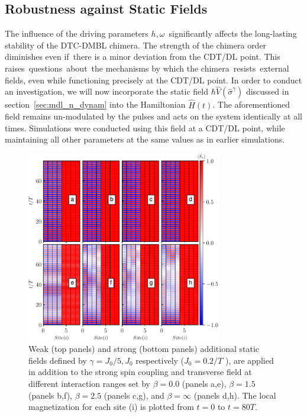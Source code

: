 \documentclass[
nofootinbib,
reprint,
superscriptaddress,
amsmath,amssymb,showkeys,
aps,
prb,
]{revtex4-2}
\begin{document}
	\subsection{\label{sec:level43} Robustness against Static Fields}
	The influence of the driving parameters $h, \omega$ significantly affects the long-lasting stability of the DTC-DMBL chimera. The strength of the chimera order diminishes even if there is a minor deviation from the CDT/DL point. This raises questions about the mechanisms by which the chimera resists external fields, even while functioning precisely at the CDT/DL point.
	In order to conduct an investigation, we will now incorporate the static field $\hbar\hat{V}(\hat{\sigma}^{\gamma})$ discussed in section~\ref{sec:mdl_n_dynam} into the Hamiltonian $\hat{H}(t)$. The aforementioned field remains un-modulated by the pulses and acts on the system identically at all times. Simulations were conducted using this field at a CDT/DL point, while maintaining all other parameters at the same values as in earlier simulations. 
	\begin{figure}
		\begin{center}
			\includegraphics[width=8.5cm]{robustness_N_8.pdf}
		\end{center}
		\caption{Weak (top panels) and strong (bottom panels) additional static fields defined by $\gamma = J_0/5, J_0$ respectively ($J_0=0.2/T$ ), are applied in addition to the strong spin coupling and transverse field at different interaction ranges set by $\beta = 0.0$ (panels a,e), $\beta= 1.5$ (panels b,f), $\beta=2.5$ (panels c,g), and $\beta= \infty$ (panels d,h). The local magnetization for each site (i) is plotted from $t=0$ to $t=80 T$.}
		\label{Fig:robustness}
	\end{figure}
\end{document}
